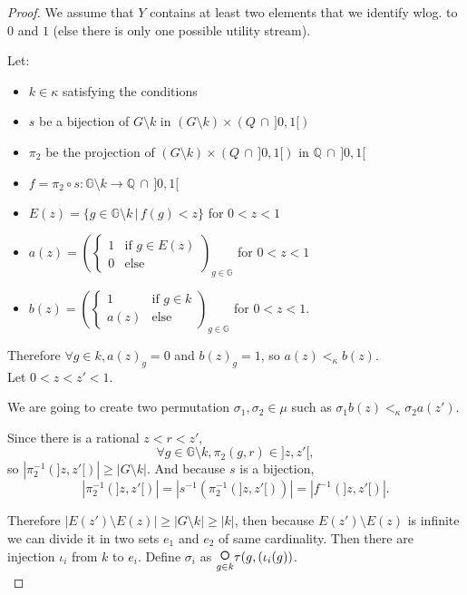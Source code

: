 \documentclass{article}
\begin{document}
\begin{proof}
  We assume that $Y$ contains at least two elements that we identify wlog. to $0$
  and $1$ (else there is only one possible utility stream).

  Let:
  \begin{itemize}
  \item $k\in\kappa$ satisfying the conditions
  \item $s$ be a bijection of $G\setminus k$ in $(G\setminus k)\times
        (Q\,\cap\,]0,1[)$
  \item $\pi_2$ be the projection of $(G\setminus k)\times (Q\,\cap\,]0,1[)$
        in $\mathbb Q\,\cap\,]0,1[$
  \item $f=\pi_2\circ s:\mathbb G\setminus k\to\mathbb Q\,\cap\,]0,1[$
  \item $E(z)=\{g\in \mathbb G\setminus k\,|\, f(g)<z\}$ for $0<z<1$
  \item $\displaystyle a(z)=\left(\left\{\begin{array}{ll}1&\text{if }g\in
        E(z)\\0&\text{else}\end{array}\right.\right)_{g\in\mathbb G}$ for $0<z<1$
  \item $\displaystyle b(z)=\left(\left\{\begin{array}{ll}1&\text{if }g\in
        k\\a(z)&\text{else}\end{array}\right.\right)_{g\in\mathbb G}$ for $0<z<1$.
  \end{itemize}

  Therefore $\forall g\in k, a(z)_g=0$ and $b(z)_g=1$, so $a(z)<_\kappa b(z)$. \\

  Let $0<z<z'<1$.

  We are going to create two permutation $\sigma_1,\sigma_2\in\mu$ such as
  $\sigma_1 b(z)<_\kappa \sigma_2 a(z')$.

  Since there is a rational $z<r<z'$,
  \[\forall g\in \mathbb G\setminus k, \pi_2(g,r)\in]z,z'[,\]
  so $|\pi_2^{-1}(]z,z'[)|\geq|G\setminus k|$. And because $s$ is a bijection,
  \[|\pi_2^{-1}(]z,z'[)|=|s^{-1}(\pi_2^{-1}(]z,z'[))|= |f^{-1}(]z,z'[)|.\]

  Therefore $|E(z')\setminus E(z)|\geq|G\setminus k|\geq |k|$, then because
  $E(z')\setminus E(z)$ is infinite we can divide it in two sets $e_1$ and
  $e_2$ of same cardinality. Then there are injection $\iota_i$ from $k$ to
  $e_i$. Define $\sigma_i$ as $\underset{g\in k}{\text{\LARGE $\circ$}}
  \tau(g,(\iota_i(g))$. \\


\end{proof}
\end{document}
